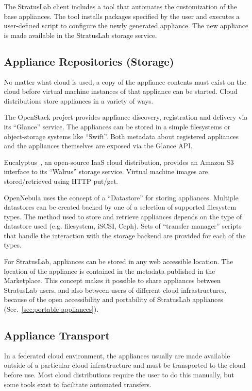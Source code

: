 The StratusLab client includes a tool that automates the customization
of the base appliances.  The tool installs packages specified by the
user and executes a user-defined script to configure the newly
generated appliance. The new appliance is made available in the
StratusLab storage service.

\subsection{Appliance Repositories (Storage)}

No matter what cloud is used, a copy of the appliance contents must
exist on the cloud before virtual machine instances of that appliance
can be started.  Cloud distributions store appliances in a variety of
ways.

The OpenStack project provides appliance discovery, registration and
delivery via its ``Glance'' service. The appliances can be stored in a
simple filesystems or object-storage systems like ``Swift''\@. Both
metadata about registered appliances and the appliances themselves are
exposed via the Glance API\@.

Eucalyptus~\cite{eucalyptus}, an open-source IaaS cloud distribution,
provides an Amazon S3 interface to its ``Walrus'' storage
service. Virtual machine images are stored/retrieved using HTTP
put/get.

OpenNebula uses the concept of a ``Datastore'' for storing appliances.
Multiple datastores can be created backed by one of a selection of
supported filesystem types.  The method used to store and retrieve
appliances depends on the type of datastore used (e.g. filesystem,
iSCSI, Ceph). Sets of ``transfer manager'' scripts that handle the
interaction with the storage backend are provided for each of the
types.

For StratusLab, appliances can be stored in any web accessible
location. The location of the appliance is contained in the metadata
published in the Marketplace\@. This concept makes it possible to
share appliances between StratusLab users, and also between users of
different cloud infrastructures, because of the open accessibility and
portability of StratusLab appliances
(Sec.~\ref{sec:portable-appliances}).

\subsection{Appliance Transport}

\label{appliance-transport}
In a federated cloud environment, the appliances usually are made
available outside of a particular cloud infrastructure and must be
transported to the cloud before use.  Most cloud distributions require
the user to do this manually, but some tools exist to facilitate
automated transfers.


